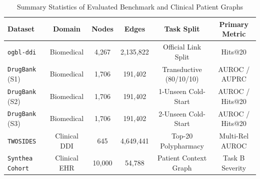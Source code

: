 \begin{table}[t]
\centering
\caption{Summary Statistics of Evaluated Benchmark and Clinical Patient Graphs}
\label{tab:datasets}
\begin{tabular}{lccccc}
\toprule
\textbf{Dataset} & \textbf{Domain} & \textbf{Nodes} & \textbf{Edges} & \textbf{Task Split} & \textbf{Primary Metric} \\
\midrule
\texttt{ogbl-ddi} & Biomedical & 4,267 & 2,135,822 & Official Link Split & Hits@20 \\
\texttt{DrugBank} (S1) & Biomedical & 1,706 & 191,402 & Transductive (80/10/10) & AUROC / AUPRC \\
\texttt{DrugBank} (S2) & Biomedical & 1,706 & 191,402 & 1-Unseen Cold-Start & AUROC / Hits@20 \\
\texttt{DrugBank} (S3) & Biomedical & 1,706 & 191,402 & 2-Unseen Cold-Start & AUROC / Hits@20 \\
\texttt{TWOSIDES} & Clinical DDI & 645 & 4,649,441 & Top-20 Polypharmacy & Multi-Rel AUROC \\
\texttt{Synthea Cohort} & Clinical EHR & 10,000 & 54,788 & Patient Context Graph & Task B Severity \\
\bottomrule
\end{tabular}
\end{table}
